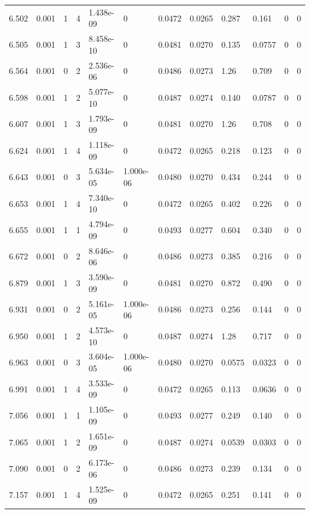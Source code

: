 \documentclass[preview]{standalone}
\begin{document}
{{{{{\begin{tabular}{L{1.2cm}C{1.2cm} C{0.3cm}C{0.5cm} C{1.4cm}C{1.4cm} C{1.4cm}C{1.4cm} C{1.6cm}C{1.6cm} C{1.6cm}C{1.6cm}}
  6.502  &  0.001  & 1     &  4 &  1.438e-09  & 0  &  0.0472&   0.0265& 0.287 & 0.161   &  0 & 0  \\ 
  6.505  &  0.001  & 1     &  3 &  8.458e-10  & 0  &  0.0481&   0.0270& 0.135 & 0.0757   &  0 & 0  \\ 
  6.564  &  0.001  & 0     &  2 &  2.536e-06  & 0  &  0.0486&   0.0273& 1.26 & 0.709   &  0 & 0  \\ 
  6.598  &  0.001  & 1     &  2 &  5.077e-10  & 0  &  0.0487&   0.0274& 0.140 & 0.0787   &  0 & 0  \\ 
  6.607  &  0.001  & 1     &  3 &  1.793e-09  & 0  &  0.0481&   0.0270& 1.26 & 0.708   &  0 & 0  \\ 
  6.624  &  0.001  & 1     &  4 &  1.118e-09  & 0  &  0.0472&   0.0265& 0.218 & 0.123   &  0 & 0  \\ 
  6.643  &  0.001  & 0     &  3 &  5.634e-05  & 1.000e-06  &  0.0480&   0.0270& 0.434 & 0.244   &  0 & 0  \\ 
  6.653  &  0.001  & 1     &  4 &  7.340e-10  & 0  &  0.0472&   0.0265& 0.402 & 0.226   &  0 & 0  \\ 
  6.655  &  0.001  & 1     &  1 &  4.794e-09  & 0  &  0.0493&   0.0277& 0.604 & 0.340   &  0 & 0  \\ 
  6.672  &  0.001  & 0     &  2 &  8.646e-06  & 0  &  0.0486&   0.0273& 0.385 & 0.216   &  0 & 0  \\ 
  6.879  &  0.001  & 1     &  3 &  3.590e-09  & 0  &  0.0481&   0.0270& 0.872 & 0.490   &  0 & 0  \\ 
  6.931  &  0.001  & 0     &  2 &  5.161e-05  & 1.000e-06  &  0.0486&   0.0273& 0.256 & 0.144   &  0 & 0  \\ 
  6.950  &  0.001  & 1     &  2 &  4.573e-10  & 0  &  0.0487&   0.0274& 1.28 & 0.717   &  0 & 0  \\ 
  6.963  &  0.001  & 0     &  3 &  3.604e-05  & 1.000e-06  &  0.0480&   0.0270& 0.0575 & 0.0323   &  0 & 0  \\ 
  6.991  &  0.001  & 1     &  4 &  3.533e-09  & 0  &  0.0472&   0.0265& 0.113 & 0.0636   &  0 & 0  \\ 
  7.056  &  0.001  & 1     &  1 &  1.105e-09  & 0  &  0.0493&   0.0277& 0.249 & 0.140   &  0 & 0  \\ 
  7.065  &  0.001  & 1     &  2 &  1.651e-09  & 0  &  0.0487&   0.0274& 0.0539 & 0.0303   &  0 & 0  \\ 
  7.090  &  0.001  & 0     &  2 &  6.173e-06  & 0  &  0.0486&   0.0273& 0.239 & 0.134   &  0 & 0  \\ 
  7.157  &  0.001  & 1     &  4 &  1.525e-09  & 0  &  0.0472&   0.0265& 0.251 & 0.141   &  0 & 0  \\ 

\end{tabular}}}}}}
\end{document}
